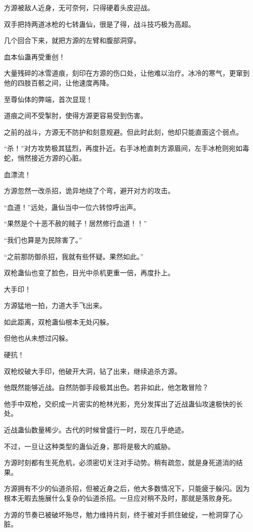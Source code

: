 \begin{this_body}
方源被敌人近身，无可奈何，只得硬着头皮迎战。

双手把持两道冰枪的七转蛊仙，很是了得，战斗技巧极为高超。

几个回合下来，就把方源的左臂和腹部洞穿。

血本仙蛊再受重创！

大量残碎的冰雪道痕，刻印在方源的伤口处，让他难以治疗。冰冷的寒气，更窜到他的四肢百骸之间，让他速度再降。

至尊仙体的弊端，首次显现！

道痕之间不受掣肘，使得方源更容易受到伤害。

之前的战斗，方源无不防护和刻意规避。但此时此刻，他却只能直面这个弱点。

“杀！”对方攻势极其猛烈，再度扑近。右手冰枪直刺方源眉间，左手冰枪则宛如毒蛇，悄然接近方源的心脏。

血漂流！

方源忽然一改杀招，诡异地绕了个弯，避开对方的攻击。

“血道！”远处，蛊仙当中一位六转惊呼出声。

“果然是个十恶不赦的贼子！居然修行血道！！”

“我们也算是为民除害了。”

“之前那防御杀招，我就有些怀疑。果然如此。”

双枪蛊仙也变了脸色，目光中杀机更重一倍，再度扑上。

大手印！

方源猛地一拍，力道大手飞出来。

如此距离，双枪蛊仙根本无处闪躲。

但他也从未想过闪躲。

硬抗！

双枪绞破大手印，他破开大洞，钻了出来，继续追杀方源。

他既然能够近战。自然防御手段极其出色。若非如此，他怎敢冒险？

他手中双枪，交织成一片密实的枪林光影，充分发挥出了近战蛊仙攻速极快的长处。

近战蛊仙数量稀少。古代的时候曾盛行一时，现在几乎绝迹。

不过，一旦让这种类型的蛊仙近身，那将是极大的威胁。

方源时刻都有生死危机，必须密切关注对手动势。稍有疏忽，就是身死道消的结果。

方源拥有不少的仙道杀招，但被近身之后，他大多数情况下，只能疲于躲闪。因为根本无暇去施展什么复杂的仙道杀招。一旦应对稍不及时，那就是落败身死。

方源的节奏已被破坏殆尽，勉力维持片刻，终于被对手抓住破绽，一枪洞穿了心脏。


\end{this_body}
